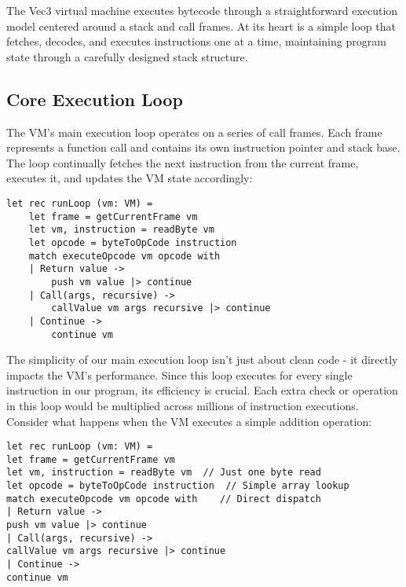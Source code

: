 The Vec3 virtual machine executes bytecode through a straightforward execution model centered around a stack and call frames.
At its heart is a simple loop that fetches, decodes, and executes instructions one at a time, maintaining program state through a carefully designed stack structure.

\subsection{Core Execution Loop}\label{subsec:core-execution-loop}

The VM's main execution loop operates on a series of call frames.
Each frame represents a function call and contains its own instruction pointer and stack base.
The loop continually fetches the next instruction from the current frame, executes it, and updates the VM state accordingly:

\begin{verbatim}
let rec runLoop (vm: VM) =
    let frame = getCurrentFrame vm
    let vm, instruction = readByte vm
    let opcode = byteToOpCode instruction
    match executeOpcode vm opcode with
    | Return value -> 
        push vm value |> continue
    | Call(args, recursive) ->
        callValue vm args recursive |> continue
    | Continue -> 
        continue vm
\end{verbatim}

The simplicity of our main execution loop isn't just about clean code - it directly impacts the VM's performance.
Since this loop executes for every single instruction in our program, its efficiency is crucial.
Each extra check or operation in this loop would be multiplied across millions of instruction executions.
Consider what happens when the VM executes a simple addition operation:
\begin{verbatim}
let rec runLoop (vm: VM) =
let frame = getCurrentFrame vm
let vm, instruction = readByte vm  // Just one byte read
let opcode = byteToOpCode instruction  // Simple array lookup
match executeOpcode vm opcode with    // Direct dispatch
| Return value ->
push vm value |> continue
| Call(args, recursive) ->
callValue vm args recursive |> continue
| Continue ->
continue vm
\end{verbatim}

